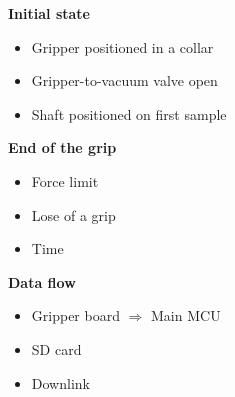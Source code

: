 \documentclass[xcolor=dvipsnames]{beamer}%
\begin{document}
\begin{frame}
\begin{multicols}{2}
{
\pause
\textbf{\small Initial state}
\begin{itemize}
\item \small Gripper positioned in a collar
\item \small Gripper-to-vacuum valve open
\item \small Shaft positioned on first sample
\end{itemize}
\pause
\vspace{0.3cm}

\textbf{\small End of the grip}
\begin{itemize}
\item \small Force limit
\item \small Lose of a grip
\item \small Time
\end{itemize}
\pause
\vspace{0.3cm}

\textbf{\small Data flow}
\begin{itemize}
\item \small Gripper board $\Rightarrow$ Main MCU
\item \small SD card
\item \small Downlink
\end{itemize}
}

\end{multicols}

\end{frame}


\end{document}
